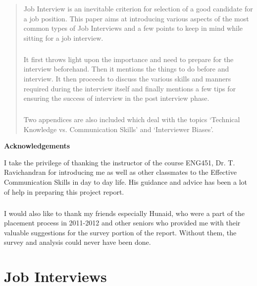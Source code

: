 \documentclass[a4paper,12pt]{report}
\makeatletter
\newcommand\ackname{Acknowledgements}
\newenvironment{acknowledgements}{%
      \titlepage
      \null\vfil
      \@beginparpenalty\@lowpenalty
      \begin{center}%
        \bfseries \ackname
        \@endparpenalty\@M
      \end{center}}%
     {\par\vfil\null\endtitlepage}
\newenvironment{acknowledgements}{%
      \if@twocolumn
        \section*{\abstractname}%
      \else
        \small
        \begin{center}%
          {\bfseries \ackname\vspace{-.5em}\vspace{\z@}}%
        \end{center}%
        \quotation
      \fi}
      {\if@twocolumn\else\endquotation\fi}
\makeatother
\begin{document}


\begin{abstract}
Job Interview is an inevitable criterion for selection of a good candidate for a job position. This paper aims at introducing various aspects
of the most common types of Job Interviews and a few points to keep in mind while sitting for a job interview.
\paragraph{}
It first throws light upon the importance and need to prepare for the interview beforehand. Then it mentions the
things to do before and interview. It then proceeds to discuss the various skills and manners required during the interview itself 
and finally mentions a few tips for ensuring the success of interview in the post interview phase.
\paragraph{}
Two appendices are also included which deal with the topics `Technical Knowledge vs. Communication Skills'
and `Interviewer Biases'.
\end{abstract}

\begin{acknowledgements}
I take the privilege of thanking the instructor of the course ENG451, Dr. T. Ravichandran
for introducing me as well as other classmates to the Effective Communication Skills
 in day to day life. His guidance and advice has been a lot of help in preparing this project report.
\paragraph{}
I would also like to thank my friends especially Hunaid, who were a part of the placement process in
2011-2012 and other seniors who provided me with their valuable suggestions for
the survey portion of the report. Without them, the survey and analysis could never have
been done.
\end{acknowledgements}

\tableofcontents
{}

\chapter{Job Interviews}             %
\end{document}
